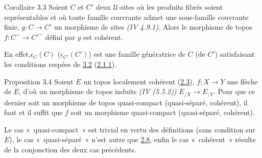\documentclass[10pt]{../fichiers-configuration-latex/smfart}
\begin{document}
\begin{enonce*}{Corollaire 3.3}
Soient $C$ et $C'$ deux $𝒰$-sites où les produits fibrés soient
représentables et où toute famille couvrante admet une sous-famille
couvrante finie, $g : C \to C'$ un morphisme de sites \emph{(IV
4.9.1)}. Alors le morphisme de topos $f: C^{\sim} \to {C'}^{\sim}$
défini par $g$ est cohérent.
\end{enonce*}

En effet,\pageoriginale $\epsilon_C(C)$ (\resp $\epsilon_{C'}(C')$) est une
famille génératrice de $C$ (\resp de $C'$) satisfaisant les conditions
respées de \hyperref[VI.prop3.2]{3.2} (\hyperref[VI.cor2.1.1]{2.1.1}).

\begin{enonce*}{Proposition 3.4}
Soient $E$ un topos localement cohérent (\hyperref[VI.def2.3]{2.3}), $f:X \to Y$ une
flèche de $E$, d'où un morphisme de topos induits \emph{(IV (5.5.2))} $E_{/X}
\to E_{/Y}$. Pour que ce dernier soit un morphisme de topos
quasi-compact (\resp quasi-séparé, \resp cohérent), il faut et il
suffit que $f$ soit un morphisme quasi-compact (\resp quasi-séparé,
\resp cohérent).
\end{enonce*}

Le cas « quasi-compact » est trivial en vertu des définitions (sans
condition sur $E$), le cas « quasi-séparé » n'est autre que \hyperref[VI.cor2.8]{2.8},
enfin le cas « cohérent » résulte de la conjonction des deux cas
précédents.
\end{document}
